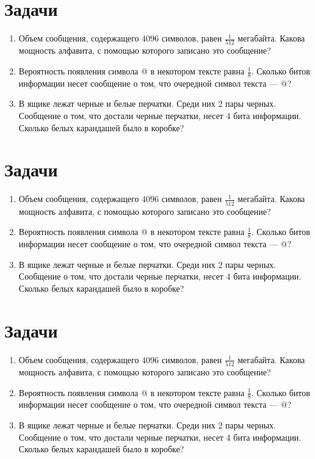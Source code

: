 \documentclass[12pt]{article}
\begin{document}
\section{Задачи}

\begin{enumerate}
\item Объем сообщения, содержащего $4096$ символов, равен $\frac{1}{512}$ мегабайта. Какова мощность алфавита, с помощью которого записано это сообщение?
\item Вероятность появления символа @ в некотором тексте равна $\frac{1}{8}$. Сколько битов информации несет сообщение о том, что очередной символ текста --- @?
\item В ящике лежат черные и белые перчатки. Среди них 2 пары черных. Сообщение о том, что достали черные перчатки, несет 4 бита информации. Сколько белых карандашей было в коробке?
\end{enumerate}

\section{Задачи}

\begin{enumerate}
\item Объем сообщения, содержащего $4096$ символов, равен $\frac{1}{512}$ мегабайта. Какова мощность алфавита, с помощью которого записано это сообщение?
\item Вероятность появления символа @ в некотором тексте равна $\frac{1}{8}$. Сколько битов информации несет сообщение о том, что очередной символ текста --- @?
\item В ящике лежат черные и белые перчатки. Среди них 2 пары черных. Сообщение о том, что достали черные перчатки, несет 4 бита информации. Сколько белых карандашей было в коробке?
\end{enumerate}

\section{Задачи}

\begin{enumerate}
\item Объем сообщения, содержащего $4096$ символов, равен $\frac{1}{512}$ мегабайта. Какова мощность алфавита, с помощью которого записано это сообщение?
\item Вероятность появления символа @ в некотором тексте равна $\frac{1}{8}$. Сколько битов информации несет сообщение о том, что очередной символ текста --- @?
\item В ящике лежат черные и белые перчатки. Среди них 2 пары черных. Сообщение о том, что достали черные перчатки, несет 4 бита информации. Сколько белых карандашей было в коробке?
\end{enumerate}
\end{document}
